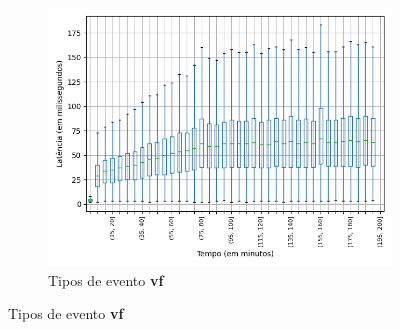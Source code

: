 \begin{figure}
\centering
\begin{subfigure}{.5\textwidth}
\centering
\includegraphics[width=\textwidth]{figuras/graphics/boxplot_10-dez-su_vf.png}
\caption{Tipos de evento \textbf{vf}}
\label{fig:BoxPlot_vf_SU_10-dez-su}
\end{subfigure}%


\end{figure}
